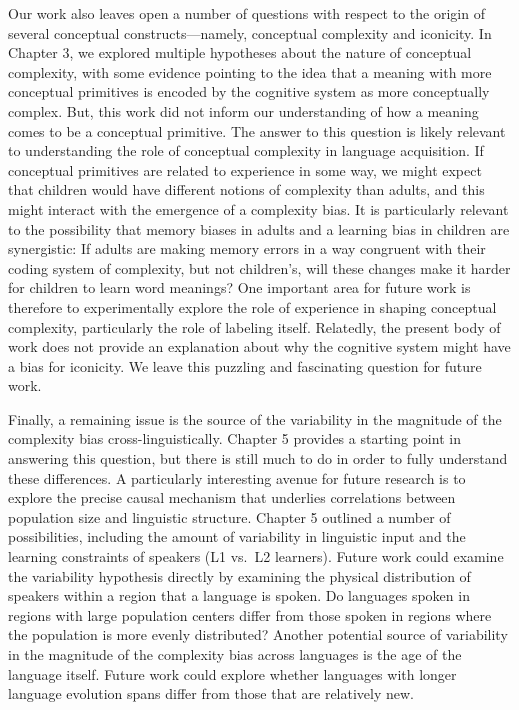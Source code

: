 Our work also leaves open a number of questions with respect to the origin of several conceptual constructs---namely, conceptual complexity and iconicity. In Chapter 3, we explored multiple hypotheses about the nature of conceptual complexity, with some evidence pointing to the idea that a meaning with more conceptual primitives is encoded by the cognitive system as more conceptually complex. But, this work did not inform our understanding of how a meaning comes to be a conceptual primitive. The answer to this question is likely relevant to understanding the role of conceptual complexity in language acquisition. If conceptual primitives are related to experience in some way, we might expect that children would have different notions of complexity than adults, and this might interact with the emergence of a complexity bias. It is particularly relevant to the possibility that memory biases in adults and a learning bias in children are synergistic: If adults are making memory errors in a way congruent with their coding system of complexity, but not children's, will these changes make it harder for children to learn word meanings? One important area for future work is therefore  to experimentally explore the role of experience in shaping conceptual complexity, particularly the role of labeling itself.  Relatedly, the present body of  work does not provide an explanation about why the cognitive system might have a bias for iconicity. We leave this puzzling and fascinating question for future work.


Finally, a remaining issue is  the source of the variability in the magnitude of the complexity bias cross-linguistically. Chapter 5 provides a starting point in answering this question, but there is still much to do in order to fully understand these differences. A particularly interesting avenue for future research is to explore the precise causal mechanism that underlies correlations between population size and linguistic structure. Chapter 5 outlined a number of possibilities, including the amount of variability in linguistic input and the learning constraints of speakers (L1 vs.\ L2 learners). Future work could examine the variability hypothesis directly by examining the physical distribution of speakers within a region that a language is spoken. Do languages spoken in regions with  large population centers differ from those spoken in regions where the population is more evenly distributed? Another potential source of variability in the magnitude of the complexity bias across languages is the age of the language itself. Future work could explore whether languages with longer language evolution spans differ from those that are relatively new. 

